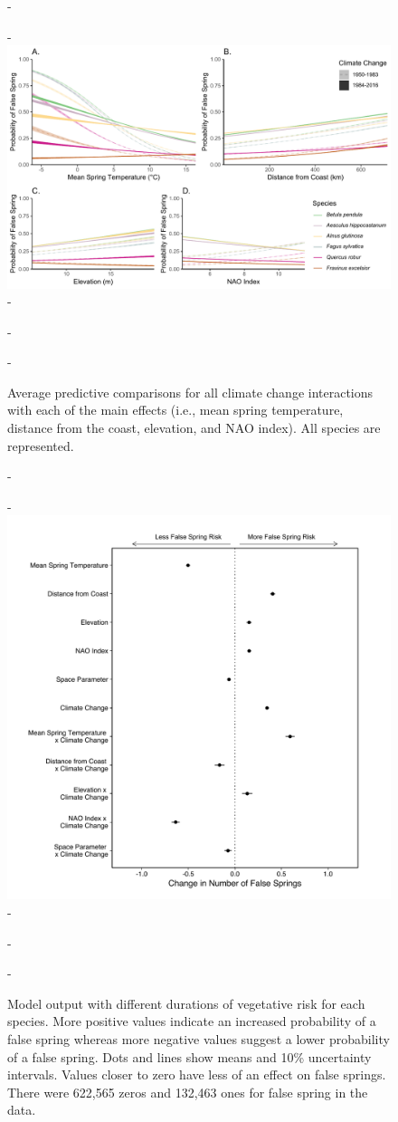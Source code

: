 \documentclass{article}\usepackage[]{graphicx}\usepackage[]{color}
\begin{document}
{{\begin{figure} [H]
  -\begin{center}
  -\includegraphics[width=16cm]{..//analyses/figures/APC_allpred_allspp_baseR.pdf}
  -\caption{Average predictive comparisons for all climate change interactions with each of the main effects (i.e., mean spring temperature, distance from the coast, elevation, and NAO index). All species are represented. }\label{fig:suppapc}
  -\end{center}
  -\end{figure}}
  
  {\begin{figure} [H]
  -\begin{center}
  -\includegraphics[width=12cm]{..//analyses/figures/model_output_dvr_90.pdf}
  -\caption{Model output with different durations of vegetative risk for each species. More positive values indicate an increased probability of a false spring whereas more negative values suggest a lower probability of a false spring. Dots and lines show means and 10\% uncertainty intervals. Values closer to zero have less of an effect on false springs. There were 622,565 zeros and 132,463 ones for false spring in the data.}\label{fig:dvr}
  -\end{center}
  -\end{figure}}
  
}
\end{document}
